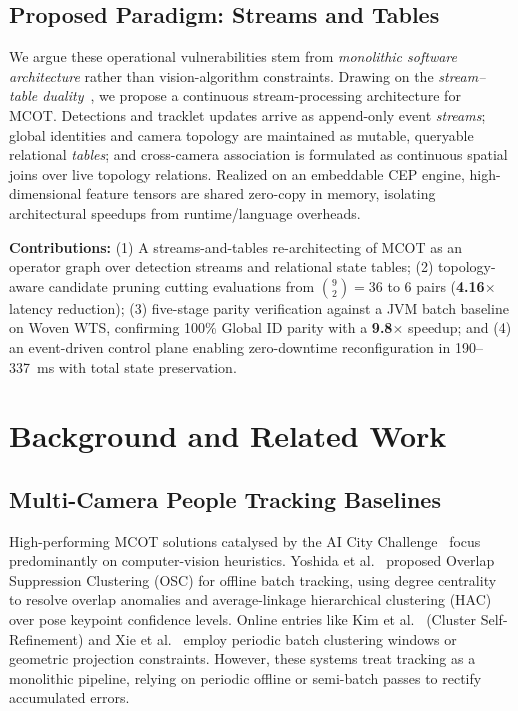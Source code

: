 \documentclass[conference]{IEEEtran}
\begin{document}
\subsection{Proposed Paradigm: Streams and Tables}
We argue these operational vulnerabilities stem from \emph{monolithic software architecture} rather than vision-algorithm constraints. Drawing on the \emph{stream--table duality}~\cite{sax2018streams}, we propose a continuous stream-processing architecture for MCOT. Detections and tracklet updates arrive as append-only event \emph{streams}; global identities and camera topology are maintained as mutable, queryable relational \emph{tables}; and cross-camera association is formulated as continuous spatial joins over live topology relations. Realized on an embeddable CEP engine, high-dimensional feature tensors are shared zero-copy in memory, isolating architectural speedups from runtime/language overheads.

\textbf{Contributions:} (1) A streams-and-tables re-architecting of MCOT as an operator graph over detection streams and relational state tables; (2) topology-aware candidate pruning cutting evaluations from $\binom{9}{2}=36$ to $6$ pairs (\textbf{4.16$\times$} latency reduction); (3) five-stage parity verification against a JVM batch baseline on Woven WTS, confirming 100\% Global ID parity with a \textbf{9.8$\times$} speedup; and (4) an event-driven control plane enabling zero-downtime reconfiguration in 190--337~ms with total state preservation.

\section{Background and Related Work}
\label{sec:background}

\subsection{Multi-Camera People Tracking Baselines}
High-performing MCOT solutions catalysed by the AI City Challenge~\cite{yoshida2024overlap,kim2024cluster,xie2024robust,specker2024ocmctrack} focus predominantly on computer-vision heuristics. Yoshida et al.~\cite{yoshida2024overlap} proposed Overlap Suppression Clustering (OSC) for offline batch tracking, using degree centrality to resolve overlap anomalies and average-linkage hierarchical clustering (HAC) over pose keypoint confidence levels. Online entries like Kim et al.~\cite{kim2024cluster} (Cluster Self-Refinement) and Xie et al.~\cite{xie2024robust} employ periodic batch clustering windows or geometric projection constraints. However, these systems treat tracking as a monolithic pipeline, relying on periodic offline or semi-batch passes to rectify accumulated errors.
\end{document}
